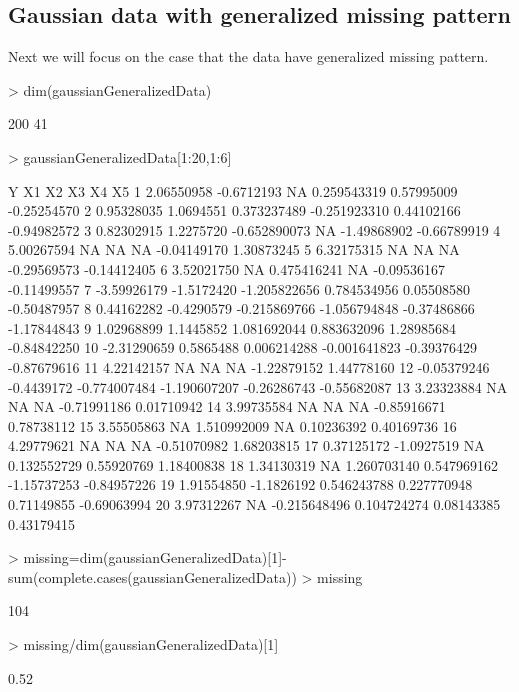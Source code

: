 \documentclass[a4paper]{article}
\begin{document}
\subsection{Gaussian data with generalized missing pattern}
Next we will focus on the case that the data have generalized missing pattern.
\begin{Schunk}
\begin{Sinput}
> dim(gaussianGeneralizedData)
\end{Sinput}
\begin{Soutput}
[1] 200  41
\end{Soutput}
\begin{Sinput}
> gaussianGeneralizedData[1:20,1:6]
\end{Sinput}
\begin{Soutput}
             Y         X1           X2           X3          X4          X5
1   2.06550958 -0.6712193           NA  0.259543319  0.57995009 -0.25254570
2   0.95328035  1.0694551  0.373237489 -0.251923310  0.44102166 -0.94982572
3   0.82302915  1.2275720 -0.652890073           NA -1.49868902 -0.66789919
4   5.00267594         NA           NA           NA -0.04149170  1.30873245
5   6.32175315         NA           NA           NA -0.29569573 -0.14412405
6   3.52021750         NA  0.475416241           NA -0.09536167 -0.11499557
7  -3.59926179 -1.5172420 -1.205822656  0.784534956  0.05508580 -0.50487957
8   0.44162282 -0.4290579 -0.215869766 -1.056794848 -0.37486866 -1.17844843
9   1.02968899  1.1445852  1.081692044  0.883632096  1.28985684 -0.84842250
10 -2.31290659  0.5865488  0.006214288 -0.001641823 -0.39376429 -0.87679616
11  4.22142157         NA           NA           NA -1.22879152  1.44778160
12 -0.05379246 -0.4439172 -0.774007484 -1.190607207 -0.26286743 -0.55682087
13  3.23323884         NA           NA           NA -0.71991186  0.01710942
14  3.99735584         NA           NA           NA -0.85916671  0.78738112
15  3.55505863         NA  1.510992009           NA  0.10236392  0.40169736
16  4.29779621         NA           NA           NA -0.51070982  1.68203815
17  0.37125172 -1.0927519           NA  0.132552729  0.55920769  1.18400838
18  1.34130319         NA  1.260703140  0.547969162 -1.15737253 -0.84957226
19  1.91554850 -1.1826192  0.546243788  0.227770948  0.71149855 -0.69063994
20  3.97312267         NA -0.215648496  0.104724274  0.08143385  0.43179415
\end{Soutput}
\begin{Sinput}
> missing=dim(gaussianGeneralizedData)[1]-sum(complete.cases(gaussianGeneralizedData))
> missing
\end{Sinput}
\begin{Soutput}
[1] 104
\end{Soutput}
\begin{Sinput}
> missing/dim(gaussianGeneralizedData)[1]
\end{Sinput}
\begin{Soutput}
[1] 0.52
\end{Soutput}
\end{Schunk}
\end{document}
